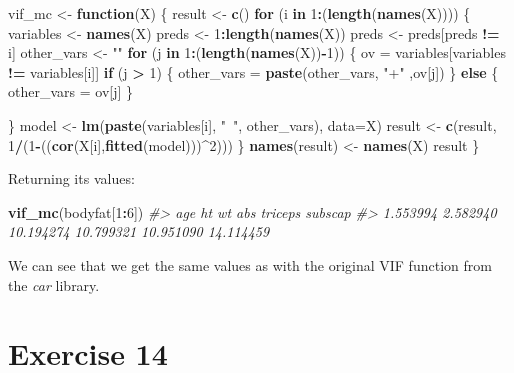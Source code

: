 \documentclass[]{article}
\newenvironment{Shaded}{\begin{snugshade}}{\end{snugshade}}
\newcommand{\CommentTok}[1]{\textcolor[rgb]{0.56,0.35,0.01}{\textit{#1}}}
\newcommand{\ControlFlowTok}[1]{\textcolor[rgb]{0.13,0.29,0.53}{\textbf{#1}}}
\newcommand{\DataTypeTok}[1]{\textcolor[rgb]{0.13,0.29,0.53}{#1}}
\newcommand{\DecValTok}[1]{\textcolor[rgb]{0.00,0.00,0.81}{#1}}
\newcommand{\KeywordTok}[1]{\textcolor[rgb]{0.13,0.29,0.53}{\textbf{#1}}}
\newcommand{\NormalTok}[1]{#1}
\newcommand{\OperatorTok}[1]{\textcolor[rgb]{0.81,0.36,0.00}{\textbf{#1}}}
\newcommand{\StringTok}[1]{\textcolor[rgb]{0.31,0.60,0.02}{#1}}
\begin{document}
\begin{Shaded}
\begin{Highlighting}[]
\NormalTok{vif_mc <-}\StringTok{ }\ControlFlowTok{function}\NormalTok{(X) \{}
\NormalTok{    result <-}\StringTok{ }\KeywordTok{c}\NormalTok{()}
    \ControlFlowTok{for}\NormalTok{ (i }\ControlFlowTok{in} \DecValTok{1}\OperatorTok{:}\NormalTok{(}\KeywordTok{length}\NormalTok{(}\KeywordTok{names}\NormalTok{(X)))) \{}
\NormalTok{        variables <-}\StringTok{ }\KeywordTok{names}\NormalTok{(X)}
\NormalTok{        preds <-}\StringTok{ }\DecValTok{1}\OperatorTok{:}\KeywordTok{length}\NormalTok{(}\KeywordTok{names}\NormalTok{(X))}
\NormalTok{        preds <-}\StringTok{ }\NormalTok{preds[preds }\OperatorTok{!=}\StringTok{ }\NormalTok{i]}
\NormalTok{        other_vars <-}\StringTok{ ""}
        \ControlFlowTok{for}\NormalTok{ (j }\ControlFlowTok{in} \DecValTok{1}\OperatorTok{:}\NormalTok{(}\KeywordTok{length}\NormalTok{(}\KeywordTok{names}\NormalTok{(X))}\OperatorTok{-}\DecValTok{1}\NormalTok{)) \{}
\NormalTok{            ov =}\StringTok{ }\NormalTok{variables[variables }\OperatorTok{!=}\StringTok{ }\NormalTok{variables[i]]}
            \ControlFlowTok{if}\NormalTok{ (j }\OperatorTok{>}\StringTok{ }\DecValTok{1}\NormalTok{) \{}
\NormalTok{                other_vars =}\StringTok{ }\KeywordTok{paste}\NormalTok{(other_vars, }\StringTok{"+"}\NormalTok{ ,ov[j])}
\NormalTok{            \} }\ControlFlowTok{else}\NormalTok{ \{}
\NormalTok{                other_vars =}\StringTok{ }\NormalTok{ov[j]}
\NormalTok{            \}}
            
\NormalTok{        \}}
\NormalTok{        model <-}\StringTok{ }\KeywordTok{lm}\NormalTok{(}\KeywordTok{paste}\NormalTok{(variables[i], }\StringTok{"~"}\NormalTok{, other_vars), }\DataTypeTok{data=}\NormalTok{X)}
\NormalTok{        result <-}\StringTok{ }\KeywordTok{c}\NormalTok{(result, }\DecValTok{1}\OperatorTok{/}\NormalTok{(}\DecValTok{1}\OperatorTok{-}\NormalTok{((}\KeywordTok{cor}\NormalTok{(X[i],}\KeywordTok{fitted}\NormalTok{(model)))}\OperatorTok{^}\DecValTok{2}\NormalTok{)))}
\NormalTok{    \}}
    \KeywordTok{names}\NormalTok{(result) <-}\StringTok{ }\KeywordTok{names}\NormalTok{(X)}
\NormalTok{    result}
\NormalTok{\}}
\end{Highlighting}
\end{Shaded}

Returning its values:

\begin{Shaded}
\begin{Highlighting}[]
\KeywordTok{vif_mc}\NormalTok{(bodyfat[}\DecValTok{1}\OperatorTok{:}\DecValTok{6}\NormalTok{])}
\CommentTok{#>       age        ht        wt       abs   triceps   subscap }
\CommentTok{#>  1.553994  2.582940 10.194274 10.799321 10.951090 14.114459}
\end{Highlighting}
\end{Shaded}

We can see that we get the same values as with the original VIF function
from the \emph{car} library.

\newpage

\hypertarget{exercise-14}{%
\section{Exercise 14}\label{exercise-14}}
\end{document}
